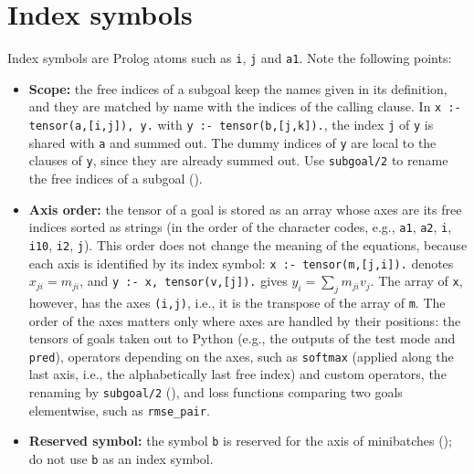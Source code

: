 \documentclass[a4paper]{report}
\begin{document}
\section{Index symbols}
\label{sec:index}

Index symbols are Prolog atoms such as {\tt i}, {\tt j} and {\tt a1}.
Note the following points:
\begin{itemize}
	\item {\bf Scope:} the free indices of a subgoal keep the names given
	in its definition, and they are matched by name with the indices of the
	calling clause.  In {\tt x :- tensor(a,[i,j]), y.} with {\tt y :-
		tensor(b,[j,k]).}, the index {\tt j} of {\tt y} is shared with {\tt a}
	and summed out.  The dummy indices of {\tt y} are local to the clauses
	of {\tt y}, since they are already summed out.  Use {\tt subgoal/2} to
	rename the free indices of a subgoal ().
	\item {\bf Axis order:} the tensor of a goal is stored as an array whose
	axes are its free indices sorted as strings (in the order of the
	character codes, e.g., {\tt a1}, {\tt a2}, {\tt i}, {\tt i10}, {\tt i2},
	{\tt j}).  This order does not change the meaning of the equations,
	because each axis is identified by its index symbol: {\tt x :-
		tensor(m,[j,i]).} denotes $x_{ji}=m_{ji}$, and {\tt y :- x,
		tensor(v,[j]).} gives $y_i=\sum_j m_{ji}v_j$.  The array of {\tt x},
	however, has the axes {\tt (i,j)}, i.e., it is the transpose of the
	array of {\tt m}.  The order of the axes matters only where axes are
	handled by their positions: the tensors of goals taken out to Python
	(e.g., the outputs of the test mode and {\tt pred}), operators depending
	on the axes, such as {\tt softmax} (applied along the last axis, i.e.,
	the alphabetically last free index) and custom operators, the renaming
	by {\tt subgoal/2} (), and loss functions
	comparing two goals elementwise, such as {\tt rmse\_pair}.
	\item {\bf Reserved symbol:} the symbol {\tt b} is reserved for the axis
	of minibatches (); do not use {\tt b} as an index symbol.
\end{itemize}
\end{document}
